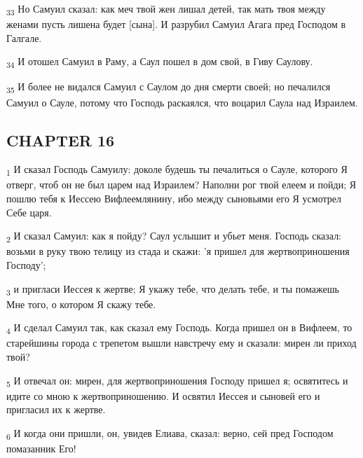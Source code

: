 \begin{tcolorbox}
\textsubscript{33} Но Самуил сказал: как меч твой жен лишал детей, так мать твоя между женами пусть лишена будет [сына]. И разрубил Самуил Агага пред Господом в Галгале.
\end{tcolorbox}
\begin{tcolorbox}
\textsubscript{34} И отошел Самуил в Раму, а Саул пошел в дом свой, в Гиву Саулову.
\end{tcolorbox}
\begin{tcolorbox}
\textsubscript{35} И более не видался Самуил с Саулом до дня смерти своей; но печалился Самуил о Сауле, потому что Господь раскаялся, что воцарил Саула над Израилем.
\end{tcolorbox}
\subsection{CHAPTER 16}
\begin{tcolorbox}
\textsubscript{1} И сказал Господь Самуилу: доколе будешь ты печалиться о Сауле, которого Я отверг, чтоб он не был царем над Израилем? Наполни рог твой елеем и пойди; Я пошлю тебя к Иессею Вифлеемлянину, ибо между сыновьями его Я усмотрел Себе царя.
\end{tcolorbox}
\begin{tcolorbox}
\textsubscript{2} И сказал Самуил: как я пойду? Саул услышит и убьет меня. Господь сказал: возьми в руку твою телицу из стада и скажи: 'я пришел для жертвоприношения Господу';
\end{tcolorbox}
\begin{tcolorbox}
\textsubscript{3} и пригласи Иессея к жертве; Я укажу тебе, что делать тебе, и ты помажешь Мне того, о котором Я скажу тебе.
\end{tcolorbox}
\begin{tcolorbox}
\textsubscript{4} И сделал Самуил так, как сказал ему Господь. Когда пришел он в Вифлеем, то старейшины города с трепетом вышли навстречу ему и сказали: мирен ли приход твой?
\end{tcolorbox}
\begin{tcolorbox}
\textsubscript{5} И отвечал он: мирен, для жертвоприношения Господу пришел я; освятитесь и идите со мною к жертвоприношению. И освятил Иессея и сыновей его и пригласил их к жертве.
\end{tcolorbox}
\begin{tcolorbox}
\textsubscript{6} И когда они пришли, он, увидев Елиава, сказал: верно, сей пред Господом помазанник Его!
\end{tcolorbox}

